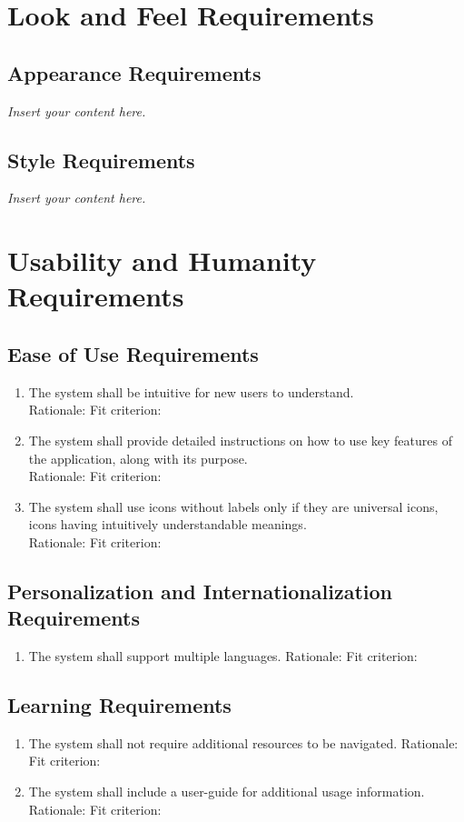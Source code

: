 \documentclass[12pt]{article}
\newcommand{\lips}{\textit{Insert your content here.}}
\begin{document}
\section{Look and Feel Requirements}
\subsection{Appearance Requirements}
\lips
\subsection{Style Requirements}
\lips

\section{Usability and Humanity Requirements}
\subsection{Ease of Use Requirements}
\begin{enumerate}[{UH-EOU}1. ]
  \item The system shall be intuitive for new users to understand.\\
  Rationale: 
  Fit criterion:  
  \item The system shall provide detailed instructions on how to use key features of the application, along with its purpose.\\
  Rationale:
  Fit criterion: 
  \item The system shall use icons without labels only if they are universal icons, icons having intuitively understandable meanings.\\
  Rationale: 
  Fit criterion: 
\end{enumerate}
\subsection{Personalization and Internationalization Requirements}
\begin{enumerate}[{UH-PI}1. ]
  \item The system shall support multiple languages.
  Rationale: 
  Fit criterion: 
\end{enumerate}
\subsection{Learning Requirements}
\begin{enumerate}[{UH-LI}1. ]
  \item The system shall not require additional resources to be navigated.
  Rationale: 
  Fit criterion: 
  \item The system shall include a user-guide for additional usage information.
  Rationale: 
  Fit criterion: 
\end{enumerate}
\end{document}
